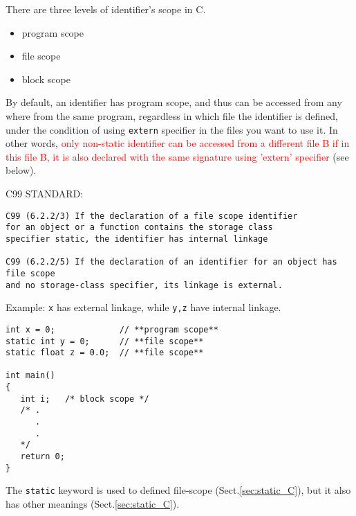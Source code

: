 There are three levels of identifier's scope in C.
\begin{itemize}
  \item program scope
  \item file scope
  \item block scope
\end{itemize}
By default, an identifier has program scope, and thus can be accessed from any
where from the same program, regardless in which file the identifier is
defined, under the condition of using \verb!extern! specifier in the files you
want to use it. In other words, \textcolor{red}{only non-static identifier can
be accessed from a different file B if in this file B, it is also declared with
the same signature using 'extern' specifier} (see below).

C99 STANDARD: 
\begin{verbatim}
C99 (6.2.2/3) If the declaration of a file scope identifier 
for an object or a function contains the storage class 
specifier static, the identifier has internal linkage

C99 (6.2.2/5) If the declaration of an identifier for an object has file scope
and no storage-class specifier, its linkage is external.
\end{verbatim}

Example: \verb!x! has external linkage, while \verb!y,z! have internal linkage.
\begin{verbatim}
int x = 0;             // **program scope**   
static int y = 0;      // **file scope**  
static float z = 0.0;  // **file scope** 

int main()  
{  
   int i;   /* block scope */  
   /* .
      .
      .
   */ 
   return 0;  
}  
\end{verbatim}
The \verb!static! keyword is used to defined file-scope
(Sect.\ref{sec:static_C}), but it also has other meanings
(Sect.\ref{sec:static_C}).

